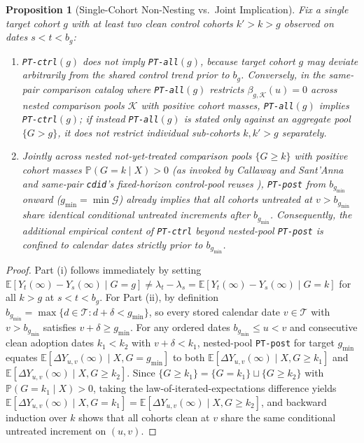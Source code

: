 \documentclass[11pt]{article}
\newtheorem{proposition}{Proposition}
\theoremstyle{definition}
\theoremstyle{remark}
\begin{document}
\begin{proposition}[Single-Cohort Non-Nesting vs.\ Joint Implication]\label{prop:hierarchy}
Fix a single target cohort $g$ with at least two clean control cohorts $k' > k > g$ observed on dates $s < t < b_g$:
\begin{enumerate}
\item[(i)] \texttt{PT-ctrl}$(g)$ does not imply \texttt{PT-all}$(g)$, because target cohort $g$ may deviate arbitrarily from the shared control trend prior to $b_g$. Conversely, in the same-pair comparison catalog where \texttt{PT-all}$(g)$ restricts $\beta_{g,\mathcal{K}}(u) = 0$ across nested comparison pools $\mathcal{K}$ with positive cohort masses, \texttt{PT-all}$(g)$ implies \texttt{PT-ctrl}$(g)$; if instead \texttt{PT-all}$(g)$ is stated only against an aggregate pool $\{G > g\}$, it does not restrict individual sub-cohorts $k, k' > g$ separately.
\item[(ii)] Jointly across nested not-yet-treated comparison pools $\{G \ge k\}$ with positive cohort masses $\mathbb{P}(G = k \mid X) > 0$ (as invoked by Callaway and Sant'Anna \cite{CS2021} and same-pair \texttt{cdid}'s fixed-horizon control-pool reuses \cite{BBD2025}), \texttt{PT-post} from $b_{g_{\min}}$ onward ($g_{\min} = \min \mathcal{G}$) already implies that all cohorts untreated at $v > b_{g_{\min}}$ share identical conditional untreated increments after $b_{g_{\min}}$. Consequently, the additional empirical content of \texttt{PT-ctrl} beyond nested-pool \texttt{PT-post} is confined to calendar dates strictly prior to $b_{g_{\min}}$.
\end{enumerate}
\end{proposition}

\begin{proof}
Part (i) follows immediately by setting $\mathbb{E}[Y_t(\infty)-Y_s(\infty)\mid G=g] \neq \lambda_t - \lambda_s = \mathbb{E}[Y_t(\infty)-Y_s(\infty)\mid G=k]$ for all $k > g$ at $s < t < b_g$. For Part (ii), by definition $b_{g_{\min}} = \max\{d \in \mathcal{T} : d + \delta < g_{\min}\}$, so every stored calendar date $v \in \mathcal{T}$ with $v > b_{g_{\min}}$ satisfies $v + \delta \ge g_{\min}$. For any ordered dates $b_{g_{\min}} \le u < v$ and consecutive clean adoption dates $k_1 < k_2$ with $v + \delta < k_1$, nested-pool \texttt{PT-post} for target $g_{\min}$ equates $\mathbb{E}[\Delta Y_{u,v}(\infty) \mid X, G = g_{\min}]$ to both $\mathbb{E}[\Delta Y_{u,v}(\infty) \mid X, G \ge k_1]$ and $\mathbb{E}[\Delta Y_{u,v}(\infty) \mid X, G \ge k_2]$. Since $\{G \ge k_1\} = \{G = k_1\} \sqcup \{G \ge k_2\}$ with $\mathbb{P}(G = k_1 \mid X) > 0$, taking the law-of-iterated-expectations difference yields $\mathbb{E}[\Delta Y_{u,v}(\infty) \mid X, G = k_1] = \mathbb{E}[\Delta Y_{u,v}(\infty) \mid X, G \ge k_2]$, and backward induction over $k$ shows that all cohorts clean at $v$ share the same conditional untreated increment on $(u,v)$.
\end{proof}
\end{document}

